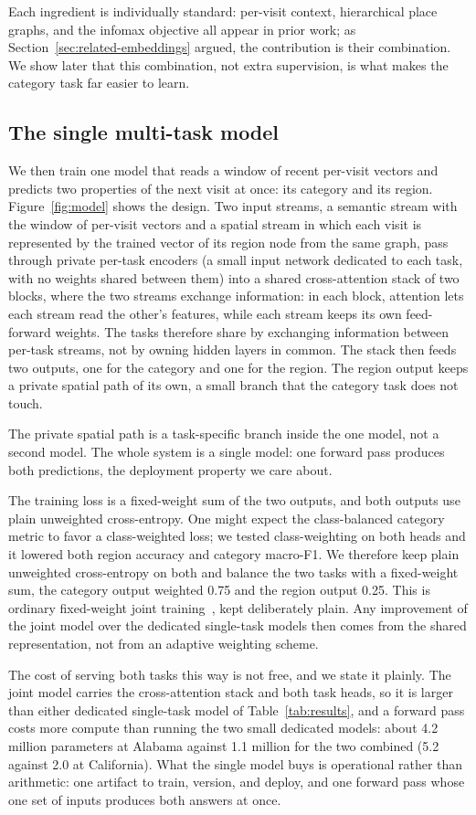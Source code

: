 Each ingredient is individually standard: per-visit context, hierarchical place
graphs, and the infomax objective all appear in prior work; as
Section~\ref{sec:related-embeddings} argued, the contribution is their
combination. We show later that this
combination, not extra supervision, is what makes the category task far easier to
learn.

\subsection{The single multi-task model}
\label{sec:method-model}

We then train one model that reads a window of recent per-visit vectors and
predicts two properties of the next visit at once: its category and its region.
Figure~\ref{fig:model} shows the design. Two input streams, a semantic stream
with the window of per-visit vectors and a spatial stream in which each visit is represented by the trained vector of its region node from the same graph, pass through private
per-task encoders (a small input network dedicated to each task, with no weights
shared between them) into a shared cross-attention stack of two blocks,
where the two streams exchange information: in each block, attention lets each
stream read the other's features, while each stream keeps its own feed-forward
weights. The tasks therefore share by exchanging information between per-task
streams, not by owning hidden layers in common. The stack then feeds two
outputs, one for the
category and one for the region. The region
output keeps a private spatial path of its own, a small branch that the category
task does not touch.

The private spatial path is a task-specific branch inside the one model, not a
second model. The whole system is a single model: one
forward pass produces both predictions, the deployment property we care about.

The training loss is a fixed-weight sum of the two outputs, and both outputs use
plain unweighted cross-entropy. One might expect the class-balanced category metric to favor a class-weighted
loss; we tested class-weighting on both heads and it lowered both region
accuracy and category macro-F1. We therefore keep plain unweighted
cross-entropy on both and balance the two tasks with a fixed-weight sum, the
category output weighted 0.75 and the region output 0.25. This is ordinary fixed-weight joint training~\cite{caruana1997multitask}, kept
deliberately plain. Any improvement of the joint model over the dedicated
single-task models then comes from the shared representation, not from an
adaptive weighting scheme.

The cost of serving both tasks this way is not free, and we state it plainly.
The joint model carries the cross-attention stack and both task heads, so it is
larger than either dedicated single-task model of
Table~\ref{tab:results}, and a forward pass costs more compute than running the
two small dedicated models: about 4.2 million parameters at Alabama against 1.1
million for the two combined (5.2 against 2.0 at
California). What the single model buys is operational rather
than arithmetic: one artifact to train, version, and deploy, and one forward
pass whose one set of inputs produces both answers at once.
